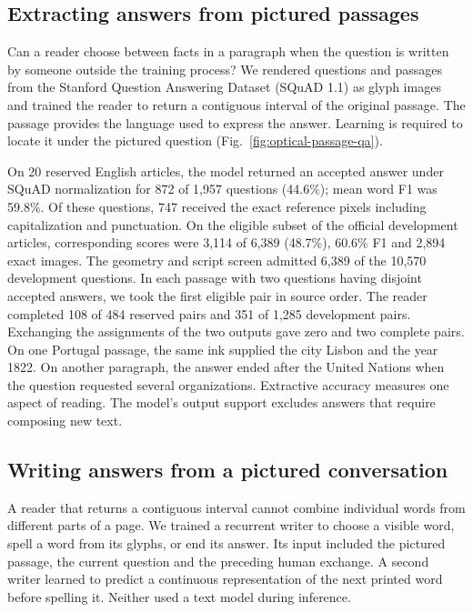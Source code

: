 \documentclass[12pt,a4paper]{article}
\providecommand{\DIFadd}[1]{{\protect\color{blue} \sf #1}} %
\begin{document}
\subsection*{\DIFadd{Extracting answers from pictured passages}}
\DIFadd{Can a reader choose between facts in a paragraph when the question is written by someone outside the training process? We rendered questions and passages from the Stanford Question Answering Dataset (SQuAD 1.1) as glyph images and trained the reader to return a contiguous interval of the original passage. The passage provides the language used to express the answer. Learning is required to locate it under the pictured question (Fig.~\ref{fig:optical-passage-qa}).
}

\DIFadd{On 20 reserved English articles, the model returned an accepted answer under SQuAD normalization for 872 of 1,957 questions (44.6\%); mean word F1 was 59.8\%. Of these questions, 747 received the exact reference pixels including capitalization and punctuation. On the eligible subset of the official development articles, corresponding scores were 3,114 of 6,389 (48.7\%), 60.6\% F1 and 2,894 exact images. The geometry and script screen admitted 6,389 of the 10,570 development questions. In each passage with two questions having disjoint accepted answers, we took the first eligible pair in source order. The reader completed 108 of 484 reserved pairs and 351 of 1,285 development pairs. Exchanging the assignments of the two outputs gave zero and two complete pairs. On one Portugal passage, the same ink supplied the city Lisbon and the year 1822. On another paragraph, the answer ended after the United Nations when the question requested several organizations. Extractive accuracy measures one aspect of reading. The model's output support excludes answers that require composing new text.
}

\subsection*{\DIFadd{Writing answers from a pictured conversation}}
\DIFadd{A reader that returns a contiguous interval cannot combine individual words from different parts of a page. We trained a recurrent writer to choose a visible word, spell a word from its glyphs, or end its answer. Its input included the pictured passage, the current question and the preceding human exchange. A second writer learned to predict a continuous representation of the next printed word before spelling it. Neither used a text model during inference.
}
\end{document}

